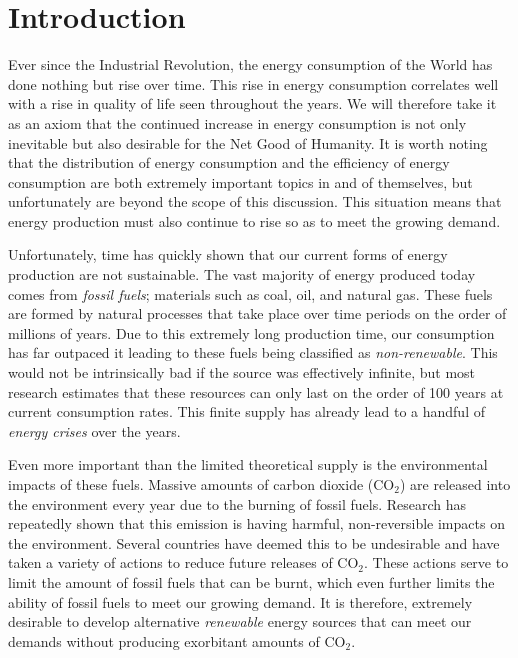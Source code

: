 \chapter{Introduction}

	Ever since the Industrial Revolution, the energy consumption of the World has done nothing but rise over time. \cite{bibid} This rise in energy consumption correlates well with a rise in quality of life seen throughout the years. \cite{bibid} We will therefore take it as an axiom that the continued increase in energy consumption is not only inevitable but also desirable for the Net Good of Humanity. It is worth noting that the distribution of energy consumption and the efficiency of energy consumption are both extremely important topics in and of themselves, but unfortunately are beyond the scope of this discussion. This situation means that energy production must also continue to rise so as to meet the growing demand.
	
	Unfortunately, time has quickly shown that our current forms of energy production are not sustainable. \cite{bibid} The vast majority of energy produced today comes from \emph{fossil fuels}; materials such as coal, oil, and natural gas. \cite{bibid} These fuels are formed by natural processes that take place over time periods on the order of millions of years. \cite{bibid} Due to this extremely long production time, our consumption has far outpaced it leading to these fuels being classified as \emph{non-renewable}. \cite{bibid} This would not be intrinsically bad if the source was effectively infinite, but most research estimates that these resources can only last on the order of 100 years at current consumption rates. \cite{bibid} This finite supply has already lead to a handful of \emph{energy crises} over the years. \cite{bibid}
	
	Even more important than the limited theoretical supply is the environmental impacts of these fuels. Massive amounts of carbon dioxide (CO$_2$) are released into the environment every year due to the burning of fossil fuels. \cite{bibid} Research has repeatedly shown that this emission is having harmful, non-reversible impacts on the environment. \cite{bibid} Several countries have deemed this to be undesirable and have taken a variety of actions to reduce future releases of CO$_2$. \cite{bibid} These actions serve to limit the amount of fossil fuels that can be burnt, which even further limits the ability of fossil fuels to meet our growing demand. It is therefore, extremely desirable to develop alternative \emph{renewable} energy sources that can meet our demands without producing exorbitant amounts of CO$_2$.
	
